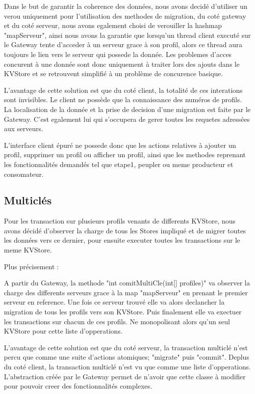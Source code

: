 Dans le but de garantir la coherence des données, nous avons decidé d'utiliser un verou uniquement pour l'utilisation des methodes de migration, du coté gateway et du coté serveur, nous avons egalement choisi de verouiller la hashmap "mapServeur", ainsi nous avons la garantie que lorsqu'un thread client executé sur le Gateway tente d'acceder à un serveur grace à son profil, alors ce thread aura toujours le lien vers le serveur qui possede la donnée. Les problemes d'acces concurent à une donnée sont donc uniquement à traiter lors des ajouts dans le KVStore et se retrouvent simplifié à un problème de concurence basique. 

L'avantage de cette solution est que du coté client, la totalité de ces interations sont invisibles. Le client ne possède que la connaissance des numéros de profils. La localisation de la donnée et la prise de decision d'une migration est faite par le Gateway. C'est egalement lui qui s'occupera de gerer toutes les requetes adressées aux serveurs.

L'interface client épuré ne possede donc que les actions relatives à ajouter un profil, supprimer un profil ou afficher un profil, ainsi que les methodes reprenant les fonctionnalités demandés tel que etape1, peupler ou meme producteur et consomateur.

\subsection {Multiclés}

Pour les transaction sur plusieurs profils venants de differents KVStore, nous avons décidé d'observer la charge de tous les Stores impliqué et de migrer toutes les données vers ce dernier, pour ensuite executer toutes les transactions sur le meme KVStore.

Plus précisement :

A partir du Gateway, la methode "int comitMultiCle(int[] profiles)" va observer la charge des differents serveurs grace à la map "mapServeur" en prenant le premier serveur en reference. Une fois ce serveur trouvé elle va alors declancher la migration de tous les profils vers son KVStore. Puis finalement elle va exectuer les transactions sur chacun de ces profils. Ne monopolisant alors qu'un seul KVStore pour cette liste d'opperations.

L'avantage de cette solution est que du coté serveur, la transaction multiclé n'est percu que comme une suite d'actions atomiques; "migrate" puis "commit".
Deplus du coté client, la transaction multiclé n'est vu que comme une liste d'opperations. L'abstraction créée par le Gateway permet de n'avoir que cette classe à modifier pour pouvoir creer des fonctionnalités complexes.


